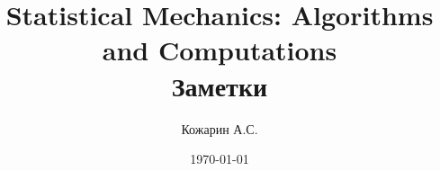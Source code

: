 \title{Statistical Mechanics: Algorithms and Computations\\Заметки}
\author{Кожарин А.С.}
\date{\today}
